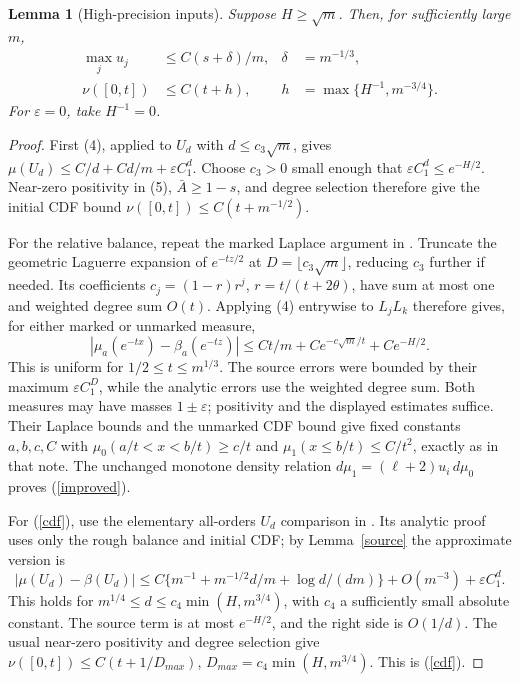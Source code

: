 \documentclass[11pt]{article}
\newtheorem{lemma}{Lemma}
\begin{document}
\begin{lemma}[High-precision inputs]\label{high}
Suppose $H\ge\sqrt m$. Then, for sufficiently large $m$,
\begin{align}
 \max_j u_j&\le C(s+\delta)/m,&\delta&=m^{-1/3},\label{improved}\\
 \nu([0,t])&\le C(t+h),&h&=\max\{H^{-1},m^{-3/4}\}.\label{cdf}
\end{align}
For $\varepsilon=0$, take $H^{-1}=0$.
\end{lemma}
\begin{proof}
First (4), applied to $U_d$ with $d\le c_3\sqrt m$, gives
$\mu(U_d)\le C/d+Cd/m+\varepsilon C_1^d$. Choose $c_3>0$
small enough that $\varepsilon C_1^d\le e^{-H/2}$. Near-zero
positivity in (5), $\bar A\ge1-s$, and degree selection therefore
give the initial CDF bound $\nu([0,t])\le C(t+m^{-1/2})$.

For the relative balance, repeat the marked Laplace argument in
. Truncate the
geometric Laguerre expansion of $e^{-tz/2}$ at
$D=\lfloor c_3\sqrt m\rfloor$, reducing $c_3$ further if needed.
Its coefficients $c_j=(1-r)r^j$, $r=t/(t+2\theta)$, have sum at
most one and weighted degree sum $O(t)$. Applying (4) entrywise to
$L_jL_k$ therefore gives, for either marked or unmarked measure,
\[
 |\mu_a(e^{-t x})-\beta_a(e^{-tz})|
 \le Ct/m+C e^{-c\sqrt m/t}+C e^{-H/2}.
 \tag{6}
\]
This is uniform for $1/2\le t\le m^{1/3}$. The source errors were
bounded by their maximum $\varepsilon C_1^D$, while the analytic
errors use the weighted degree sum. Both measures may have masses
$1\pm\varepsilon$; positivity and the displayed estimates suffice.
Their Laplace bounds and the unmarked CDF bound give fixed constants
$a,b,c,C$ with
$\mu_0(a/t<x<b/t)\ge c/t$ and
$\mu_1(x\le b/t)\le C/t^2$, exactly as in that note.
The unchanged monotone density relation
$d\mu_1=(\ell+2)u_i\,d\mu_0$ proves (\ref{improved}).

For (\ref{cdf}), use the elementary all-orders $U_d$ comparison in
.
Its analytic proof uses only the rough balance and initial CDF;
by Lemma~\ref{source} the approximate version is
\[
 |\mu(U_d)-\beta(U_d)|
 \le C\{m^{-1}+m^{-1/2}d/m+\log d/(dm)\}
       +O(m^{-3})+\varepsilon C_1^d.
 \tag{7}
\]
This holds for $m^{1/4}\le d\le c_4\min(H,m^{3/4})$, with
$c_4$ a sufficiently small absolute constant. The source term is
at most $e^{-H/2}$, and the right side is $O(1/d)$.
The usual near-zero positivity and degree selection give
$\nu([0,t])\le C(t+1/D_{max})$,
$D_{max}=c_4\min(H,m^{3/4})$. This is (\ref{cdf}).
\end{proof}
\end{document}
